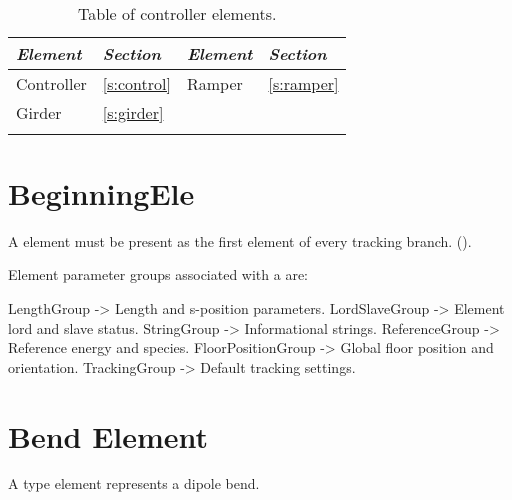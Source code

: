 \begin{table}[ht]
\centering
{\tt
\begin{tabular}{llll} \toprule
  {\it Element}  & {\it Section}     & {\it Element}  & {\it Section}    \\ \midrule
  Controller     & \ref{s:control}     &  Ramper        & \ref{s:ramper}   \\
  Girder         & \ref{s:girder}    &                &                  \\
 \\ \bottomrule
\end{tabular}
}
\caption{Table of controller elements.}
\label{t:control.classes}
\end{table}

\newpage

\section{BeginningEle}
\label{s:begin.ele}

A  element must be present as the first element of every tracking branch.
().

Element parameter groups associated with a  are:
\begin{example}
  LengthGroup          -> Length and s-position parameters.
  LordSlaveGroup       -> Element lord and slave status.
  StringGroup          -> Informational strings.
  ReferenceGroup       -> Reference energy and species.
  FloorPositionGroup   -> Global floor position and orientation.
  TrackingGroup        -> Default tracking settings.
\end{example}

\newpage

\section{Bend Element}
\label{s:bend}

A  type element represents a dipole bend. 


